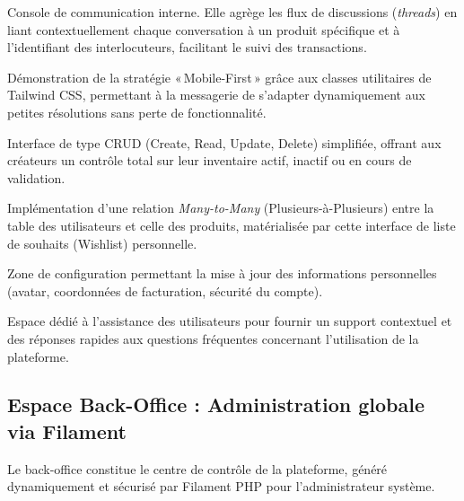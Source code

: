 
Console de communication interne. Elle agrège les flux de discussions (\textit{threads}) en liant contextuellement chaque conversation à un produit spécifique et à l'identifiant des interlocuteurs, facilitant le suivi des transactions.


Démonstration de la stratégie «\,Mobile-First\,» grâce aux classes utilitaires de Tailwind CSS, permettant à la messagerie de s'adapter dynamiquement aux petites résolutions sans perte de fonctionnalité.


Interface de type CRUD (Create, Read, Update, Delete) simplifiée, offrant aux créateurs un contrôle total sur leur inventaire actif, inactif ou en cours de validation.


Implémentation d'une relation \textit{Many-to-Many} (Plusieurs-à-Plusieurs) entre la table des utilisateurs et celle des produits, matérialisée par cette interface de liste de souhaits (Wishlist) personnelle.


Zone de configuration permettant la mise à jour des informations personnelles (avatar, coordonnées de facturation, sécurité du compte).


Espace dédié à l'assistance des utilisateurs pour fournir un support contextuel et des réponses rapides aux questions fréquentes concernant l'utilisation de la plateforme.

\subsection{Espace Back-Office : Administration globale via Filament}
Le back-office constitue le centre de contrôle de la plateforme, généré dynamiquement et sécurisé par Filament PHP pour l'administrateur système.

